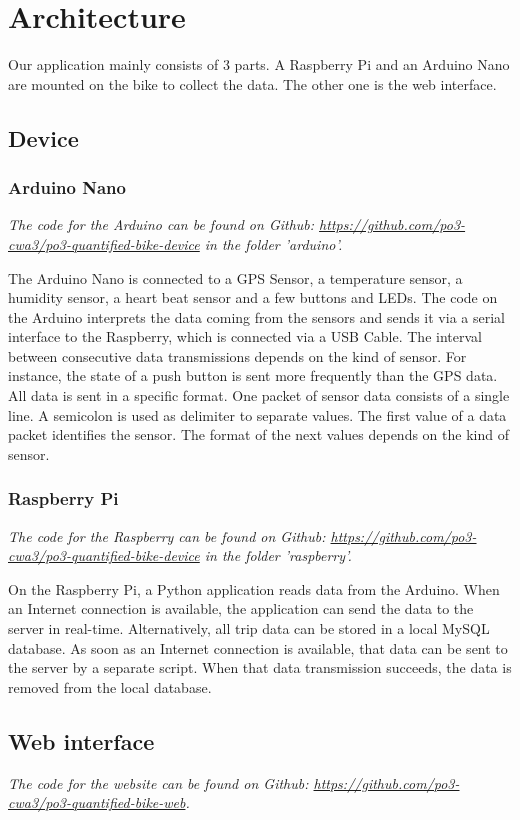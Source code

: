 \section{Architecture}
Our application mainly consists of 3 parts. 
A Raspberry Pi and an Arduino Nano are mounted on the bike to collect the data. 
The other one is the web interface.
\subsection{Device}
\subsubsection{Arduino Nano}
\textit{The code for the Arduino can be found on Github: \url{https://github.com/po3-cwa3/po3-quantified-bike-device} in the folder 'arduino'.}

The Arduino Nano is connected to a GPS Sensor, a temperature sensor, a humidity sensor, a heart beat sensor and a few buttons and LEDs. 
The code on the Arduino interprets the data coming from the sensors and sends it via a serial interface to the Raspberry, which is connected via a USB Cable.
The interval between consecutive data transmissions depends on the kind of sensor. 
For instance, the state of a push button is sent more frequently than the GPS data.
All data is sent in a specific format. One packet of sensor data consists of a single line.
A semicolon is used as delimiter to separate values. The first value of a data packet identifies the sensor. 
The format of the next values depends on the kind of sensor.
\subsubsection{Raspberry Pi}
\textit{The code for the Raspberry can be found on Github: \url{https://github.com/po3-cwa3/po3-quantified-bike-device} in the folder 'raspberry'.}

On the Raspberry Pi, a Python application reads data from the Arduino. 
When an Internet connection is available, the application can send the data to the server in real-time.
Alternatively, all trip data can be stored in a local MySQL database. 
As soon as an Internet connection is available, that data can be sent to the server by a separate script.
When that data transmission succeeds, the data is removed from the local database.
\subsection{Web interface}
\textit{The code for the website can be found on Github: \url{https://github.com/po3-cwa3/po3-quantified-bike-web}.}


